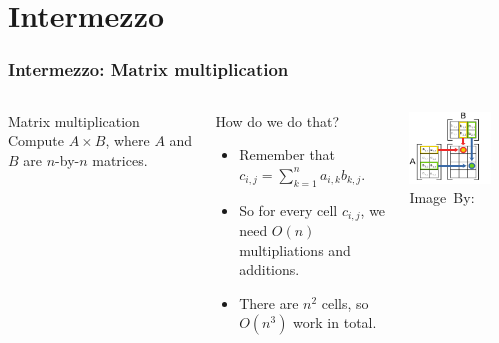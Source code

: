 \section{Intermezzo}
\label{sec:intermezzo}

\begin{frame}
	\frametitle{Intermezzo: Matrix multiplication}
	\begin{columns}
		\begin{problemblock}{Matrix multiplication}
			Compute $A \times B$, where $A$ and $B$ are $n$-by-$n$ matrices.	
		\end{problemblock}
		\begin{answerblock}{How do we do that?}
			\begin{itemize}
				\item Remember that $c_{i,j} = \sum\limits_{k=1}^n a_{i,k}b_{k,j}$.
				\item So for every cell $c_{i,j}$, we need $O(n)$ multipliations and additions.
				\item There are $n^2$ cells, so $O(n^3)$ work in total.
			\end{itemize}
		\end{answerblock}
	\begin{center}
		\includegraphics[width=0.8\textwidth]{figures/matrix_multiplication.png}\\
		\hspace*{15pt}\hbox{\scriptsize Image By:}
	\end{center}
	\end{columns}
\end{frame}
	

